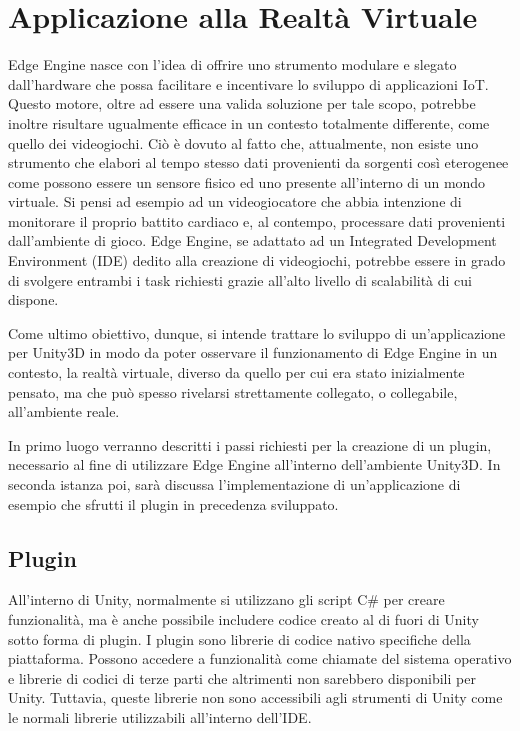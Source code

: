 \section{Applicazione alla Realtà Virtuale}
Edge Engine nasce con l’idea di offrire uno strumento modulare e slegato dall'hardware che possa facilitare e incentivare lo sviluppo di applicazioni IoT. Questo motore, oltre ad essere una valida soluzione per tale scopo, potrebbe inoltre risultare ugualmente efficace in un contesto totalmente differente, come quello dei videogiochi. Ciò è dovuto al fatto che, attualmente, non esiste uno strumento che elabori al tempo stesso dati provenienti da sorgenti così eterogenee come possono essere un sensore fisico ed uno presente all'interno di un mondo virtuale. Si pensi ad esempio ad un videogiocatore che abbia intenzione di monitorare il proprio battito cardiaco e, al contempo, processare dati provenienti dall’ambiente di gioco. Edge Engine, se adattato ad un Integrated Development Environment (IDE) dedito alla creazione di videogiochi, potrebbe essere in grado di svolgere entrambi i task richiesti grazie all’alto livello di scalabilità di cui dispone.

Come ultimo obiettivo, dunque, si intende trattare lo sviluppo di un’applicazione per Unity3D in modo da poter osservare il funzionamento di Edge Engine in un contesto, la realtà virtuale, diverso da quello per cui era stato inizialmente pensato, ma che può spesso rivelarsi strettamente collegato, o collegabile, all'ambiente reale.

In primo luogo verranno descritti i passi richiesti per la creazione di un plugin, necessario al fine di utilizzare Edge Engine all'interno dell'ambiente Unity3D. In seconda istanza poi, sarà discussa l'implementazione di un'applicazione di esempio che sfrutti il plugin in precedenza sviluppato.
\subsection{Plugin}\label{plugin}
All'interno di Unity, normalmente si utilizzano gli script C\# per creare funzionalità, ma è anche possibile includere codice creato al di fuori di Unity sotto forma di plugin. I plugin sono librerie di codice nativo specifiche della piattaforma. Possono accedere a funzionalità come chiamate del sistema operativo e librerie di codici di terze parti che altrimenti non sarebbero disponibili per Unity. Tuttavia, queste librerie non sono accessibili agli strumenti di Unity come le normali librerie utilizzabili all'interno dell'IDE.


